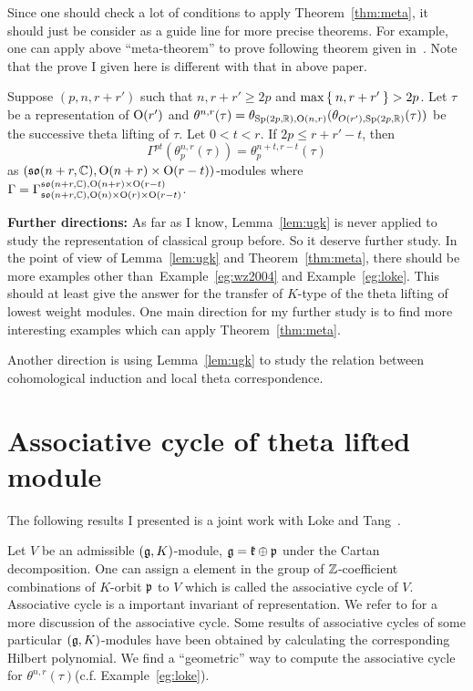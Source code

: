 \documentclass{amsart}
\begin{document}
Since one should check a lot of conditions to apply
Theorem~\ref{thm:meta}, it should just be consider as a guide line for
more precise theorems. For example, one can apply above ``meta-theorem'' to prove following theorem given in~\cite{LokeMaTang2011}. 
Note that the prove I given here is different with that in above paper.
\begin{eg} \label{eg:loke} Suppose
  $(p,n, r + r')$ such that $n,r+r'\geq2p$ and $\max\Set{n,r+r'}> 2p$.
  Let $\tau$ be a representation of ${\rm O}(r')$ and $\theta^{n,r}(\tau) =
  \theta_{{\rm Sp}(2p,{\mathbb{R}}),{\rm O}(n,r)}(\theta_{O(r'),{\rm Sp}(2p,{\mathbb{R}})}(\tau))$ be
  the successive theta lifting of $\tau$. Let $0 < t< r$.
  If $2p \leq r+r'-t$, then
\[
\Gamma^{pt}(\theta_p^{n,r}(\tau)) =
  \theta_p^{n+t,r-t}(\tau)
\]
as $(\mathfrak{so}(n+r,{\mathbb{C}}), {\rm O}(n+r)\times{\rm O}(r-t))$-modules where $\Gamma = \Gamma_{\mathfrak{so}(n+r,{\mathbb{C}}),{\rm O}(n)\times {\rm O}(r)\times {\rm O}(r-t)}^{\mathfrak{so}(n+r,{\mathbb{C}}),{\rm O}(n+r)\times {\rm O}(r-t)}$.
\end{eg}

{\bf Further directions:} As far as I know, Lemma~\ref{lem:ugk} is
never applied to study the representation of classical group
before. So it deserve further study.  In the point of view of
Lemma~\ref{lem:ugk} and Theorem~\ref{thm:meta}, there should be more
examples other than~Example~\ref{eg:wz2004} and Example~\ref{eg:loke}.
This should at least give the answer for the transfer of $K$-type of
the theta lifting of lowest weight modules. One main direction for my
further study is to find more interesting examples which can apply
Theorem~\ref{thm:meta}.

Another direction is using Lemma~\ref{lem:ugk} to study the relation between 
cohomological induction and local theta correspondence. 


\section{Associative cycle of theta lifted module}
The following results I presented is a joint work with Loke and Tang~\cite{lokematan2011b}.

Let $V$ be an admissible $(\mathfrak{g},K)$-module, $\mathfrak{g} = \mathfrak{k}\oplus \mathfrak{p}$
under the Cartan decomposition.  One can assign a element in the group
of
${\mathbb{Z}}$-coefficient combinations of $K$-orbit $\mathfrak{p}$ to $V$ which is called the
associative cycle of $V$. Associative cycle is a important invariant
of representation.  We refer to \cite{Vogan1989Var} for a more
discussion of the associative cycle.
Some results of associative cycles of  some particular $(\mathfrak{g},K)$-modules
have been obtained by calculating the corresponding Hilbert polynomial.
We find a ``geometric'' way to compute the associative cycle for
$\theta^{n,r}(\tau)$(c.f. Example~\ref{eg:loke}).
\end{document}
